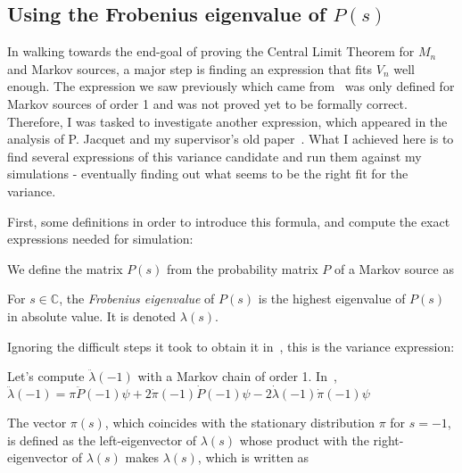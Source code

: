 
\subsection{Using the Frobenius eigenvalue of $P(s)$}


In walking towards the end-goal of proving the Central Limit
Theorem for $M_n$ and Markov sources, a major step is finding
an expression that fits $V_n$ well enough. The expression we
saw previously which came from~\cite{leckey_limit_2015} was 
only defined for Markov sources of order 1 and was not proved yet
to be formally correct. Therefore, I was tasked to investigate
another expression, which appeared in the analysis of 
P. Jacquet and my supervisor's old paper~\cite{jacquet_average_2001}.
What I achieved here is to find several expressions of 
this variance candidate and run them against my simulations - eventually
finding out what seems to be the right fit for the variance.

First, some definitions in order to introduce this formula, and 
compute the exact expressions needed for simulation:

\begin{df}
    We define the matrix $P(s)$ from the probability matrix $P$ of a 
    Markov source as
    \label{def:ps}
\end{df}

\begin{df}
    For $s\in\mathbb{C}$, the \emph{Frobenius eigenvalue} of $P(s)$ is the highest 
    eigenvalue of $P(s)$ in absolute value. It is denoted $\lambda(s)$.
    \label{def:frob}
\end{df}

\noindent
Ignoring the difficult steps it took to obtain it in~\cite{jacquet_average_2001},
this is the variance expression:


\noindent Let's compute $\ddot{\lambda}(-1)$ with a Markov chain of order 1.
In~\cite{jacquet_average_2001},
\centers
    {$ \ddot{\lambda}(-1) = \pi \ddot{P}(-1)\psi
                        + 2 \dot{\pi}(-1) \dot{P}(-1) \psi
                        - 2 \dot{\lambda}(-1) \dot{\pi}(-1) \psi $}

\noindent The vector $\pi(s)$, which coincides with the stationary
distribution $\pi$ for $s=-1$, is defined as the left-eigenvector of 
$\lambda(s)$ whose product with the right-eigenvector of $\lambda(s)$
makes $\lambda(s)$, which is written as
   
